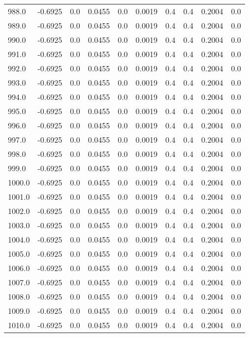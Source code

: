 \begin{longtable}{lrrrrrrrrr}
988.0 & -0.6925 & 0.0 & 0.0455 & 0.0 & 0.0019 & 0.4 & 0.4 & 0.2004 & 0.0 \\
989.0 & -0.6925 & 0.0 & 0.0455 & 0.0 & 0.0019 & 0.4 & 0.4 & 0.2004 & 0.0 \\
990.0 & -0.6925 & 0.0 & 0.0455 & 0.0 & 0.0019 & 0.4 & 0.4 & 0.2004 & 0.0 \\
991.0 & -0.6925 & 0.0 & 0.0455 & 0.0 & 0.0019 & 0.4 & 0.4 & 0.2004 & 0.0 \\
992.0 & -0.6925 & 0.0 & 0.0455 & 0.0 & 0.0019 & 0.4 & 0.4 & 0.2004 & 0.0 \\
993.0 & -0.6925 & 0.0 & 0.0455 & 0.0 & 0.0019 & 0.4 & 0.4 & 0.2004 & 0.0 \\
994.0 & -0.6925 & 0.0 & 0.0455 & 0.0 & 0.0019 & 0.4 & 0.4 & 0.2004 & 0.0 \\
995.0 & -0.6925 & 0.0 & 0.0455 & 0.0 & 0.0019 & 0.4 & 0.4 & 0.2004 & 0.0 \\
996.0 & -0.6925 & 0.0 & 0.0455 & 0.0 & 0.0019 & 0.4 & 0.4 & 0.2004 & 0.0 \\
997.0 & -0.6925 & 0.0 & 0.0455 & 0.0 & 0.0019 & 0.4 & 0.4 & 0.2004 & 0.0 \\
998.0 & -0.6925 & 0.0 & 0.0455 & 0.0 & 0.0019 & 0.4 & 0.4 & 0.2004 & 0.0 \\
999.0 & -0.6925 & 0.0 & 0.0455 & 0.0 & 0.0019 & 0.4 & 0.4 & 0.2004 & 0.0 \\
1000.0 & -0.6925 & 0.0 & 0.0455 & 0.0 & 0.0019 & 0.4 & 0.4 & 0.2004 & 0.0 \\
1001.0 & -0.6925 & 0.0 & 0.0455 & 0.0 & 0.0019 & 0.4 & 0.4 & 0.2004 & 0.0 \\
1002.0 & -0.6925 & 0.0 & 0.0455 & 0.0 & 0.0019 & 0.4 & 0.4 & 0.2004 & 0.0 \\
1003.0 & -0.6925 & 0.0 & 0.0455 & 0.0 & 0.0019 & 0.4 & 0.4 & 0.2004 & 0.0 \\
1004.0 & -0.6925 & 0.0 & 0.0455 & 0.0 & 0.0019 & 0.4 & 0.4 & 0.2004 & 0.0 \\
1005.0 & -0.6925 & 0.0 & 0.0455 & 0.0 & 0.0019 & 0.4 & 0.4 & 0.2004 & 0.0 \\
1006.0 & -0.6925 & 0.0 & 0.0455 & 0.0 & 0.0019 & 0.4 & 0.4 & 0.2004 & 0.0 \\
1007.0 & -0.6925 & 0.0 & 0.0455 & 0.0 & 0.0019 & 0.4 & 0.4 & 0.2004 & 0.0 \\
1008.0 & -0.6925 & 0.0 & 0.0455 & 0.0 & 0.0019 & 0.4 & 0.4 & 0.2004 & 0.0 \\
1009.0 & -0.6925 & 0.0 & 0.0455 & 0.0 & 0.0019 & 0.4 & 0.4 & 0.2004 & 0.0 \\
1010.0 & -0.6925 & 0.0 & 0.0455 & 0.0 & 0.0019 & 0.4 & 0.4 & 0.2004 & 0.0 \\

\end{longtable}
